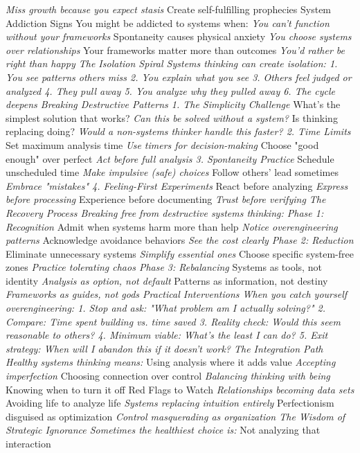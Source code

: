 \documentclass[12pt]{book}
\begin{document}
\textit{ Miss growth because you expect stasis
} Create self-fulfilling prophecies
System Addiction Signs
You might be addicted to systems when:
\textit{ You can't function without your frameworks
} Spontaneity causes physical anxiety
\textit{ You choose systems over relationships
} Your frameworks matter more than outcomes
\textit{ You'd rather be right than happy
The Isolation Spiral
Systems thinking can create isolation:
1. You see patterns others miss
2. You explain what you see
3. Others feel judged or analyzed
4. They pull away
5. You analyze why they pulled away
6. The cycle deepens
Breaking Destructive Patterns
1. The Simplicity Challenge
} What's the simplest solution that works?
\textit{ Can this be solved without a system?
} Is thinking replacing doing?
\textit{ Would a non-systems thinker handle this faster?
2. Time Limits
} Set maximum analysis time
\textit{ Use timers for decision-making
} Choose "good enough" over perfect
\textit{ Act before full analysis
3. Spontaneity Practice
} Schedule unscheduled time
\textit{ Make impulsive (safe) choices
} Follow others' lead sometimes
\textit{ Embrace "mistakes"
4. Feeling-First Experiments
} React before analyzing
\textit{ Express before processing
} Experience before documenting
\textit{ Trust before verifying
The Recovery Process
Breaking free from destructive systems thinking:
Phase 1: Recognition
} Admit when systems harm more than help
\textit{ Notice overengineering patterns
} Acknowledge avoidance behaviors
\textit{ See the cost clearly
Phase 2: Reduction
} Eliminate unnecessary systems
\textit{ Simplify essential ones
} Choose specific system-free zones
\textit{ Practice tolerating chaos
Phase 3: Rebalancing
} Systems as tools, not identity
\textit{ Analysis as option, not default
} Patterns as information, not destiny
\textit{ Frameworks as guides, not gods
Practical Interventions
When you catch yourself overengineering:
1. Stop and ask: "What problem am I actually solving?"
2. Compare: Time spent building vs. time saved
3. Reality check: Would this seem reasonable to others?
4. Minimum viable: What's the least I can do?
5. Exit strategy: When will I abandon this if it doesn't work?
The Integration Path
Healthy systems thinking means:
} Using analysis where it adds value
\textit{ Accepting imperfection
} Choosing connection over control
\textit{ Balancing thinking with being
} Knowing when to turn it off
Red Flags to Watch
\textit{ Relationships becoming data sets
} Avoiding life to analyze life
\textit{ Systems replacing intuition entirely
} Perfectionism disguised as optimization
\textit{ Control masquerading as organization
The Wisdom of Strategic Ignorance
Sometimes the healthiest choice is:
} Not analyzing that interaction
\end{document}

